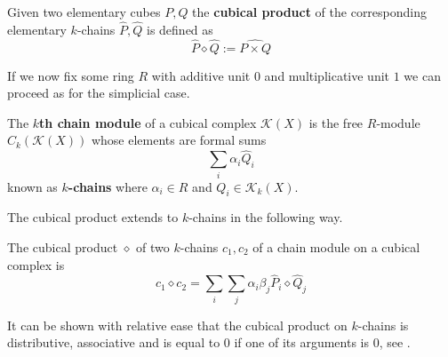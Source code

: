 \begin{example}
\begin{definition}
Given two elementary cubes $P,Q$ the \textbf{cubical product} of the corresponding elementary $k$-chains $\hat P, \hat Q$ is defined as \[\hat P \diamond \hat Q:= \widehat{P \times Q}\]
\end{definition}
If we now fix some ring $R$ with additive unit $0$ and multiplicative unit $1$ we can proceed as for the simplicial case.
\begin{definition}
  The \textbf{$k$th chain module} of a cubical complex $\mathcal{K}(X)$ is the free $R$-module $C_{k}(\mathcal{K}(X))$ whose elements are formal sums
  \[ \sum_{i} \alpha_{i} \hat Q_{i}\]
  known as \textbf{$k$-chains} where $\alpha_{i} \in R$ and $Q_{i} \in \mathcal{K}_{k}(X)$.
\end{definition}

The cubical product extends to $k$-chains in the following way.

\begin{definition}
The cubical product $\diamond$ of two $k$-chains $c_{1},c_{2}$ of a chain module on a cubical complex is \[ c_{1} \diamond c_{2} = \sum_{i} \sum_{j} \alpha_{i} \beta_{j} \hat P_{i} \diamond  \hat Q_{j}\]
\end{definition}

It can be shown with relative ease that the cubical product on $k$-chains is distributive, associative and is equal to 0 if one of its arguments is 0, see \cite[Proposition 2.25, p. ~51]{kaczynski2004}.


\end{example}
